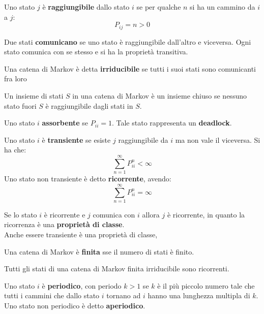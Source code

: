 \documentclass[a4paper,12pt, oneside]{book}
\begin{document}
\begin{definizione}
  Uno stato $j$ è \textbf{raggiungibile} dallo stato $i$ se per qualche $n$ si
  ha un cammino da $i$ a $j$:
  \[P_{ij}=n>0\]
\end{definizione}
\begin{definizione}
  Due stati \textbf{comunicano} se uno stato è raggiungibile dall'altro e
  viceversa. Ogni stato comunica con se stesso e si ha la proprietà transitiva.
\end{definizione}
\begin{definizione}
  Una catena di Markov è detta \textbf{irriducibile} se tutti i suoi stati sono
  comunicanti fra loro 
\end{definizione}
\begin{definizione}
  Un insieme di stati $S$ in una catena di Markov è un insieme chiuso se nessuno
  stato fuori $S$ è raggiungibile dagli stati in $S$. 
\end{definizione}
\begin{definizione}
  Uno stato $i$ \textbf{assorbente} se $P_{ii}=1$. Tale stato rappresenta un
  \textbf{deadlock}.
\end{definizione}
\begin{definizione}
  Uno stato $i$ è \textbf{transiente} se esiste $j$ raggiungibile da $i$ ma non
  vale il viceversa. Si ha che:
  \[\sum_{n=1}^\infty P_{ii}^n<\infty\]
  Uno stato non transiente è detto \textbf{ricorrente}, avendo:
  \[\sum_{n=1}^\infty P_{ii}^n=\infty\]
\end{definizione}
\begin{teorema}
  Se lo stato $i$ è ricorrente e $j$ comunica con $i$ allora $j$ è ricorrente,
  in quanto la ricorrenza è una \textbf{proprietà di classe}.\\
  Anche essere transiente è una proprietà di classe,
\end{teorema}
\begin{definizione}
  Una catena di Markov è \textbf{finita} sse il numero di stati è finito.
\end{definizione}
\begin{teorema}
  Tutti gli stati di una catena di Markov finita irriducibile sono ricorrenti.
\end{teorema}
\begin{definizione}
  Uno stato $i$ è \textbf{periodico}, con periodo $k>1$ se $k$ è il più piccolo
  numero tale che tutti i cammini che dallo stato $i$ tornano ad $i$ hanno una
  lunghezza multipla di $k$.\\
  Uno stato non periodico è detto \textbf{aperiodico}.
\end{definizione}
\end{document}
